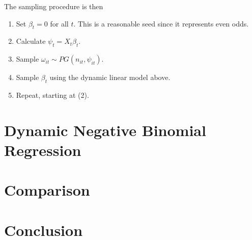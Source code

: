 \documentclass[11pt]{article}
\begin{document}
The sampling procedure is then
\begin{enumerate}
\item Set $\beta_t = 0$ for all $t$.  This is a reasonable seed since it
  represents even odds.
\item Calculate $\psi_t = X_t \beta_t$.
\item Sample $\omega_{it} \sim PG(n_{it}, \psi_{it})$.
\item Sample $\beta_t$ using the dynamic linear model above.
\item Repeat, starting at (2).
\end{enumerate}

\section{Dynamic Negative Binomial Regression}

\section{Comparison}

\section{Conclusion}

{}

\end{document}
